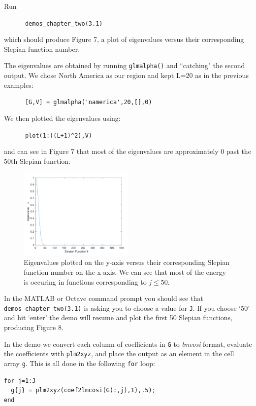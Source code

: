 \documentclass[11pt]{article}
\begin{document}
Run

\verb|		demos_chapter_two(3.1)|

which should produce Figure 7, a plot of eigenvalues versus their corresponding Slepian function number.

The eigenvalues are obtained by running \verb|glmalpha()| and ``catching" the second output. We chose North America as our region and kept L=20 as in the previous examples:

\verb|		[G,V] = glmalpha('namerica',20,[],0)|

We then plotted the eigenvalues using:

\verb|		plot(1:((L+1)^2),V)|

and can see in Figure 7 that most of the eigenvalues are approximately 0 past the 50th Slepian function. 

\begin{figure}[H]
  \centering
  \includegraphics[width=0.5\textwidth]{figures/figure7.png}
  \caption{Eigenvalues plotted on the y-axis versus their corresponding Slepian function number on the x-axis. We can see that most of the energy is occuring in functions corresponding to $j\leq50$.}
\label{figure7}
\end{figure}

In the MATLAB or Octave command prompt you should see that \verb|demos_chapter_two(3.1)| is asking you to choose a value for \verb|J|.  If you choose `50' and hit `enter' the demo will resume and plot the first 50 Slepian functions, producing Figure 8.

In the demo we convert each column of coefficients in \verb|G| to \textit{lmcosi} format, evaluate the coefficients with \verb|plm2xyz|, and place the output as an element in the cell array \verb|g|. This is all done in the following \verb|for| loop:

\verb|for j=1:J| \\
\verb|	g{j} = plm2xyz(coef2lmcosi(G(:,j),1),.5);| \\
\verb|end|
\end{document}
